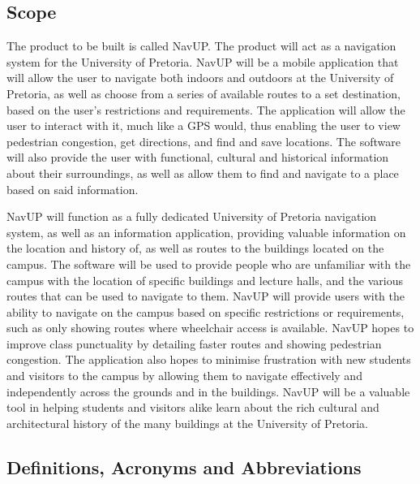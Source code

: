 \documentclass[12pt]{article}
\begin{document}
	\subsection{Scope}
	The product to be built is called NavUP. The product will act as a navigation system for the University of Pretoria. NavUP will be a mobile application that will allow the user to navigate both indoors and outdoors at the University of Pretoria, as well as choose from a series of available routes to a set destination, based on the user’s restrictions and requirements. The application will allow the user to interact with it, much like a GPS would, thus enabling the user to view pedestrian congestion, get directions, and find and save locations. The software will also provide the user with functional, cultural and historical information about their surroundings, as well as allow them to find and navigate to a place based on said information.
	
	\vspace{\baselineskip}
	NavUP will function as a fully dedicated University of Pretoria navigation system, as well as an information application, providing valuable information on the location and history of, as well as routes to the buildings located on the campus. The software will be used to provide people who are unfamiliar with the campus with the location of specific buildings and lecture halls, and the various routes that can be used to navigate to them. NavUP will provide users with the ability to navigate on the campus based on specific restrictions or requirements, such as only showing routes where wheelchair access is available. NavUP hopes to improve class punctuality by detailing faster routes and showing pedestrian congestion. The application also hopes to minimise frustration with new students and visitors to the campus by allowing them to navigate effectively and independently across the grounds and in the buildings. NavUP will be a valuable tool in helping students and visitors alike learn about the rich cultural and architectural history of the many buildings at the University of Pretoria.
	
	\subsection{Definitions, Acronyms and Abbreviations}
		
\end{document}
